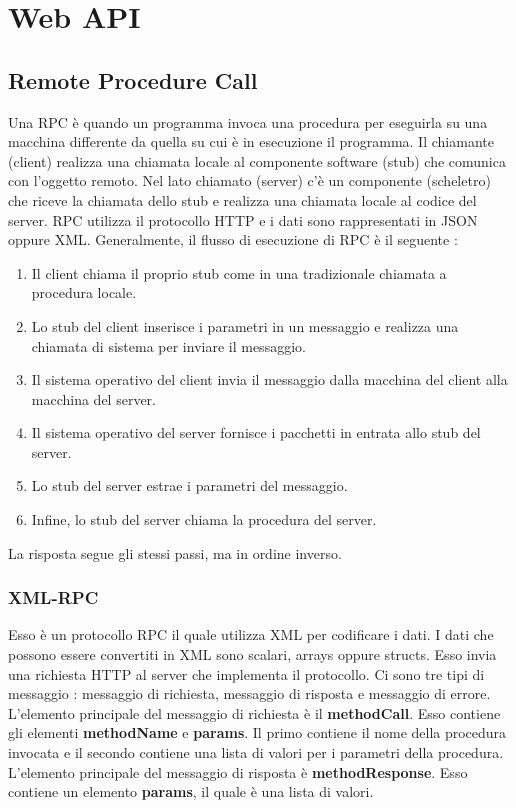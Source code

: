 \documentclass[12pt]{report}
\begin{document}
\chapter{Web API}
\section{Remote Procedure Call}
Una RPC è quando un programma invoca una procedura per eseguirla su una macchina differente da quella su cui è in esecuzione il programma. Il chiamante (client) realizza una chiamata locale al componente software (stub) che comunica con l'oggetto remoto. Nel lato chiamato (server) c'è un componente (scheletro) che riceve la chiamata dello stub e realizza una chiamata locale al codice del server. RPC utilizza il protocollo HTTP e i dati sono rappresentati in JSON oppure XML. Generalmente, il flusso di esecuzione di RPC è il seguente :
\begin{enumerate}
\item Il client chiama il proprio stub come in una tradizionale chiamata a procedura locale.
\item Lo stub del client inserisce i parametri in un messaggio e realizza una chiamata di sistema per inviare il messaggio.
\item Il sistema operativo del client invia il messaggio dalla macchina del client alla macchina del server.
\item Il sistema operativo del server fornisce i pacchetti in entrata allo stub del server.
\item Lo stub del server estrae i parametri del messaggio.
\item Infine, lo stub del server chiama la procedura del server.
\end{enumerate}
La risposta segue gli stessi passi, ma in ordine inverso.
\subsection{XML-RPC}
Esso è un protocollo RPC il quale utilizza XML per codificare i dati. I dati che possono essere convertiti in XML sono scalari, arrays oppure structs. Esso invia una richiesta HTTP al server che implementa il protocollo. Ci sono tre tipi di messaggio : messaggio di richiesta, messaggio di risposta e messaggio di errore. L'elemento principale del messaggio di richiesta è il \textbf{methodCall}. Esso contiene gli elementi \textbf{methodName} e \textbf{params}. Il primo contiene il nome della procedura invocata e il secondo contiene una lista di valori per i parametri della procedura. L'elemento principale del messaggio di risposta è \textbf{methodResponse}. Esso contiene un elemento \textbf{params}, il quale è una lista di valori.
\end{document}
